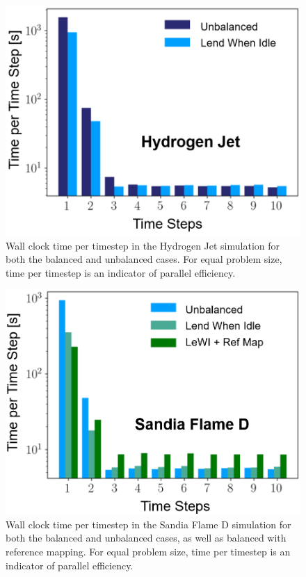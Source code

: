 \documentclass[letterpaper,twocolumn,10pt]{article}
\begin{document}
\begin{figure}[h!]
    \centering
    \includegraphics[width=1.03\linewidth]{Figures/H2_Results.PNG}
    \caption{Wall clock time per timestep in the Hydrogen Jet simulation for both the balanced and unbalanced cases. For equal problem size, time per timestep is an indicator of parallel efficiency.}
    \label{fig:ResultH2}
\end{figure}
\begin{figure}[h!]
    \centering
    \includegraphics[width=1.03\linewidth]{Figures/Sandia_D_Results.PNG}
    \caption{Wall clock time per timestep in the Sandia Flame D simulation for both the balanced and unbalanced cases, as well as balanced with reference mapping. For equal problem size, time per timestep is an indicator of parallel efficiency.}
    \label{fig:ResultD}
\end{figure}
\end{document}
